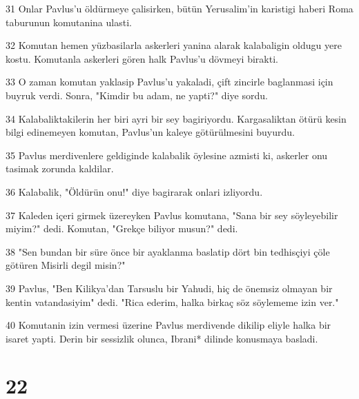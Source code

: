 \par 31 Onlar Pavlus'u öldürmeye çalisirken, bütün Yerusalim'in karistigi haberi Roma taburunun komutanina ulasti.
\par 32 Komutan hemen yüzbasilarla askerleri yanina alarak kalabaligin oldugu yere kostu. Komutanla askerleri gören halk Pavlus'u dövmeyi birakti.
\par 33 O zaman komutan yaklasip Pavlus'u yakaladi, çift zincirle baglanmasi için buyruk verdi. Sonra, "Kimdir bu adam, ne yapti?" diye sordu.
\par 34 Kalabaliktakilerin her biri ayri bir sey bagiriyordu. Kargasaliktan ötürü kesin bilgi edinemeyen komutan, Pavlus'un kaleye götürülmesini buyurdu.
\par 35 Pavlus merdivenlere geldiginde kalabalik öylesine azmisti ki, askerler onu tasimak zorunda kaldilar.
\par 36 Kalabalik, "Öldürün onu!" diye bagirarak onlari izliyordu.
\par 37 Kaleden içeri girmek üzereyken Pavlus komutana, "Sana bir sey söyleyebilir miyim?" dedi. Komutan, "Grekçe biliyor musun?" dedi.
\par 38 "Sen bundan bir süre önce bir ayaklanma baslatip dört bin tedhisçiyi çöle götüren Misirli degil misin?"
\par 39 Pavlus, "Ben Kilikya'dan Tarsuslu bir Yahudi, hiç de önemsiz olmayan bir kentin vatandasiyim" dedi. "Rica ederim, halka birkaç söz söylememe izin ver."
\par 40 Komutanin izin vermesi üzerine Pavlus merdivende dikilip eliyle halka bir isaret yapti. Derin bir sessizlik olunca, Ibrani* dilinde konusmaya basladi.

\chapter{22}

